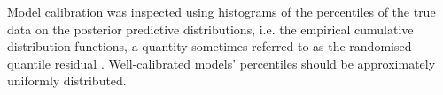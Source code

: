 Model calibration was inspected using histograms
of the percentiles of the true data on the 
posterior predictive distributions, i.e.
the empirical cumulative distribution functions, 
a quantity sometimes referred to as the
randomised quantile residual \citep{dunn1996}.
Well-calibrated models' percentiles should be
approximately uniformly distributed.

